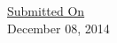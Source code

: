 \begin{titlepage}
\begin{center}

\vspace{0.3in}
\large \underline{Submitted On}\\
\large {December 08, 2014}

\end{center}
\end{titlepage}


